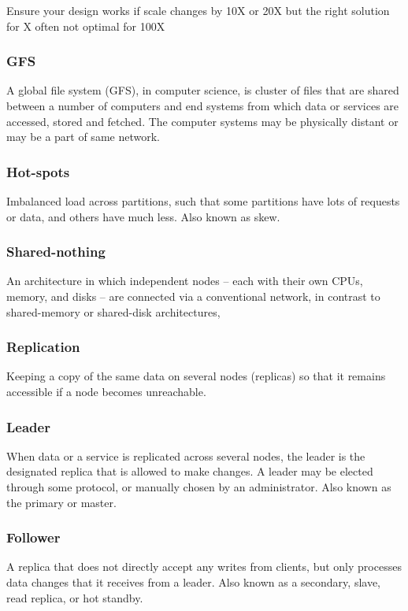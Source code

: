 \documentclass{article}
\begin{document}
    
    Ensure your design works if scale changes by 10X or 20X but the right solution for X often not optimal for 100X
    
    \subsubsection{GFS}
    A global file system (GFS), in computer science, is cluster of files that are shared between a number of computers and end systems from which data or services are accessed, stored and fetched. The computer systems may be physically distant or may be a part of same network.
    
    \subsubsection{Hot-spots}
    Imbalanced load across partitions, such that some partitions have lots of requests or data, and others have much less. Also known as skew.
    
    \subsubsection{Shared-nothing}
    An architecture in which independent nodes -- each with their own CPUs, memory, and disks -- are connected via a conventional network, in contrast to shared-memory or shared-disk architectures,
    
    \subsubsection{Replication}
    Keeping a copy of the same data on several nodes (replicas) so that it remains accessible if a node becomes unreachable.
    
    \subsubsection{Leader}
    When data or a service is replicated across several nodes, the leader is the designated replica that is allowed to make changes. A leader may be elected through some protocol, or manually chosen by an administrator. Also known as the primary or master.
    
    \subsubsection{Follower}
    A replica that does not directly accept any writes from clients, but only processes data changes that it receives from a leader. Also known as a secondary, slave, read replica, or hot standby.
    
\end{document}
